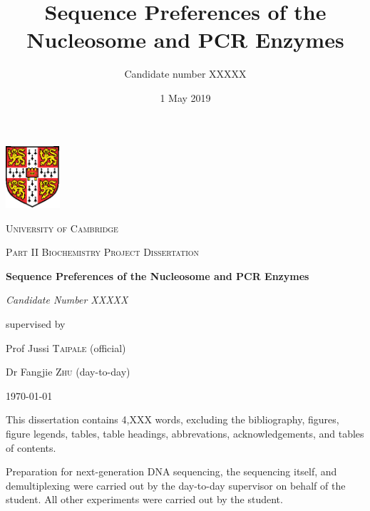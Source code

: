\documentclass[a4paper, numbers=noenddot]{scrbook}
\title{Sequence Preferences of the Nucleosome and PCR Enzymes}
\author{Candidate number XXXXX}
\date{1 May 2019}
\begin{document}

\frontmatter

\begin{titlepage}
  \centering
  \includegraphics[width=0.15\textwidth]{University_Crest}\par\vspace{1cm}
  {\scshape\LARGE University of Cambridge \par}
  \vspace{0.5cm}
  {\scshape\Large Part II Biochemistry Project Dissertation\par}
  \vspace{1cm}
  {\huge\bfseries Sequence Preferences of the Nucleosome and PCR Enzymes\par}
  \vspace{1.5cm}
  {\Large\itshape Candidate Number XXXXX\par}
  \vfill
  supervised by\par
  Prof Jussi \textsc{Taipale} (official)\par
  Dr Fangjie \textsc{Zhu} (day-to-day)
  \vfill

  {\large \today\par}
  \vfill
  This dissertation contains 4,XXX words, excluding the bibliography, figures, figure legends, tables, table headings, abbrevations, acknowledgements, and tables of contents.
  \end{titlepage}

Preparation for next-generation DNA sequencing, the sequencing itself, and demultiplexing were carried out by the day-to-day supervisor on behalf of the student.  All other experiments were carried out by the student.
  
\end{document}
